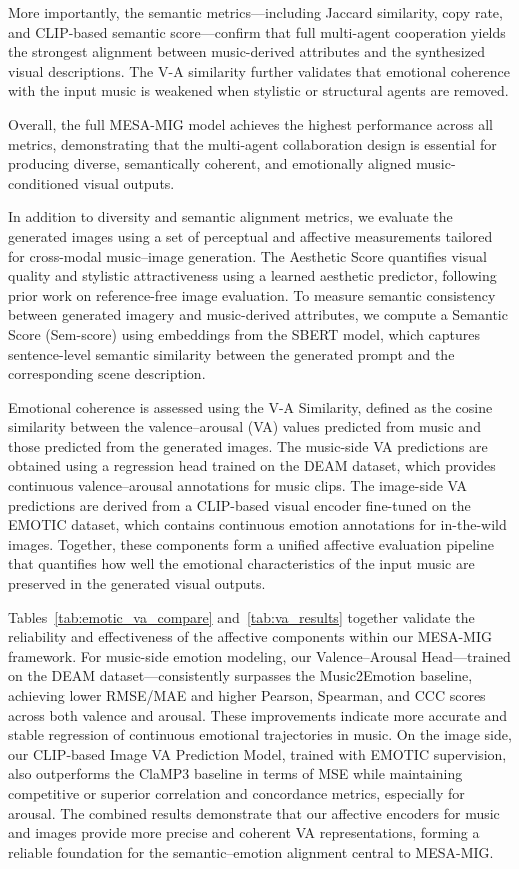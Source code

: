 \documentclass[letterpaper]{article}
\begin{document}
More importantly, the semantic metrics---including Jaccard similarity, copy rate, and CLIP-based semantic score---confirm that full multi-agent cooperation yields the strongest alignment between music-derived attributes and the synthesized visual descriptions.  
The V-A similarity further validates that emotional coherence with the input music is weakened when stylistic or structural agents are removed.

Overall, the full MESA-MIG model achieves the highest performance across all metrics, demonstrating that the multi-agent collaboration design is essential for producing diverse, semantically coherent, and emotionally aligned music-conditioned visual outputs.

In addition to diversity and semantic alignment metrics, we evaluate the generated images using a set of perceptual and affective measurements tailored for cross-modal music–image generation.
The Aesthetic Score quantifies visual quality and stylistic attractiveness using a learned aesthetic predictor, following prior work on reference-free image evaluation.
To measure semantic consistency between generated imagery and music-derived attributes, we compute a Semantic Score (Sem-score) using embeddings from the SBERT \cite{reimers2019sentencebert}model, which captures sentence-level semantic similarity between the generated prompt and the corresponding scene description.

Emotional coherence is assessed using the V-A Similarity, defined as the cosine similarity between the valence–arousal (VA) values predicted from music and those predicted from the generated images.
The music-side VA predictions are obtained using a regression head trained on the DEAM dataset\cite{aljanaki2017deam}, which provides continuous valence–arousal annotations for music clips.
The image-side VA predictions are derived from a CLIP-based visual encoder\cite{radford2021clip} fine-tuned on the EMOTIC dataset\cite{kosti2017emotic}, which contains continuous emotion annotations for in-the-wild images.
Together, these components form a unified affective evaluation pipeline that quantifies how well the emotional characteristics of the input music are preserved in the generated visual outputs.

Tables~\ref{tab:emotic_va_compare} and~\ref{tab:va_results} together validate the reliability and effectiveness of the affective components within our MESA-MIG framework. For music-side emotion modeling, our Valence–Arousal Head—trained on the DEAM dataset—consistently surpasses the Music2Emotion baseline, achieving lower RMSE/MAE and higher Pearson, Spearman, and CCC scores across both valence and arousal. These improvements indicate more accurate and stable regression of continuous emotional trajectories in music. On the image side, our CLIP-based Image VA Prediction Model, trained with EMOTIC supervision, also outperforms the ClaMP3 baseline in terms of MSE while maintaining competitive or superior correlation and concordance metrics, especially for arousal. The combined results demonstrate that our affective encoders for music and images provide more precise and coherent VA representations, forming a reliable foundation for the semantic–emotion alignment central to MESA-MIG.
\end{document}
